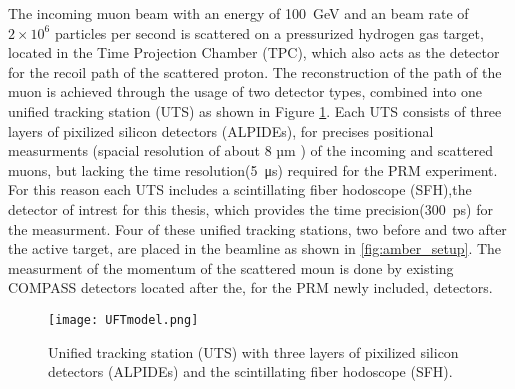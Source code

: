 The incoming muon beam with an energy of \SI{100} {\giga\electronvolt}\autocite{ProposalAmber} and an beam rate of $2 \times 10^6$\autocite{ConfrancePaperDAQ} particles per second is scattered on a pressurized hydrogen gas target, located in the Time Projection Chamber (TPC), 
which also acts as the detector for the recoil path of the scattered proton.
\newline
The reconstruction of the path of the muon is achieved through the usage of two detector types,
 combined into one unified tracking station (UTS) as shown in Figure \ref{UTSpicture}.
\newline
Each UTS consists of three layers of pixilized silicon detectors (ALPIDEs), for precises positional measurments (spacial resolution of about 8 µm \autocite{Amber2022Status}) of the incoming and scattered muons, 
but lacking the time resolution(\SI{5} {\micro\second}\autocite{Amber2022Status}) required for the PRM experiment.
For this reason each UTS includes a scintillating fiber hodoscope (SFH),the detector of intrest for this thesis,
 which provides the time precision(\SI{300} {\pico\second}\Autocite{Amber2022Status}) for the measurment.
 \newline
Four of these unified tracking stations, two before and two after the active target, are placed in the beamline as shown in \ref{fig:amber_setup}.
The measurment of the momentum of the scattered moun is done by existing COMPASS detectors located after the, 
for the PRM newly included, detectors\autocite{ProposalAmber}.

\begin{figure}[H]	
	\centering
	\texttt{[image: UFTmodel.png]}
	\caption{Unified tracking station (UTS) with three layers of pixilized silicon detectors (ALPIDEs) and the scintillating fiber hodoscope (SFH). \autocite{InternalcommunicationKarl}}
	\label{UTSpicture}
\end{figure}
